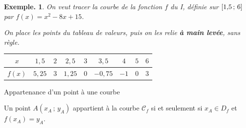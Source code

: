 \documentclass[12pt]{article}
\theoremstyle{break}
\newtheorem*{example}{Exemple.}
\begin{document}
\begin{example}
    On veut tracer la courbe de la fonction $f$ du I, définie sur $\mathopen{[}1{,}5\,;\,6\mathclose{]}$ par $f(x)=x^2-8x+15$.

    On place les points du tableau de valeurs, puis on les relie \textbf{à main levée}, sans règle.

\begin{minipage}{0.55\linewidth}
\renewcommand{\arraystretch}{1.4}
\begin{center}
\begin{tabular}{|c|c|c|c|c|c|c|c|c|}
    \hline
    $x$ & $1{,}5$ & $2$ & $2{,}5$ & $3$ & $3{,}5$ & $4$ & $5$ & $6$ \\
    \hline
    $f(x)$ & $5{,}25$ & $3$ & $1{,}25$ & $0$ & $-0{,}75$ & $-1$ & $0$ & $3$ \\
    \hline
\end{tabular}
\end{center}
\end{minipage}
\hfill
\begin{minipage}{0.42\linewidth}
\begin{center}
\end{center}
\end{minipage}
\end{example}

\begin{proposition}{Appartenance d'un point à une courbe}{}
  \begin{multihide}
    Un point $A(x_A\,;\,y_A)$ appartient à la courbe $\mathcal{C}_f$ si et seulement si $x_A \in D_f$ et $f(x_A) = y_A$.
  \end{multihide}
\end{proposition}
\end{document}
